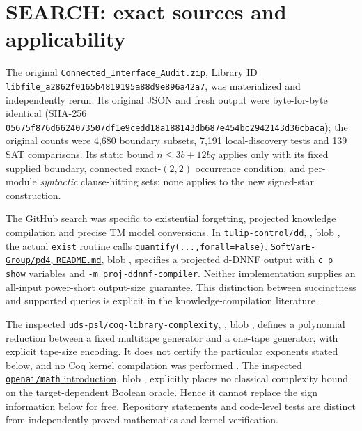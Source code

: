 \documentclass[11pt]{article}
\begin{document}
\section{SEARCH: exact sources and applicability}
The original \texttt{Connected\_Interface\_Audit.zip}, Library ID \texttt{libfile\_a2862f0165b4819195a88d9e896a42a7}, was materialized and independently rerun. Its original JSON and fresh output were byte-for-byte identical (SHA-256 \texttt{05675f876d6624073507df1e9cedd18a188143db687e454bc2942143d36cbaca}); the original counts were 4,680 boundary subsets, 7,191 local-discovery tests and 139 SAT comparisons. Its static bound $n\le3b+12bq$ applies only with its fixed supplied boundary, connected exact-$(2,2)$ occurrence condition, and per-module \emph{syntactic} clause-hitting sets; none applies to the new signed-star construction.

The GitHub search was specific to existential forgetting, projected knowledge compilation and precise TM model conversions. In \href{https://github.com/tulip-control/dd/blob/4442d498ddea1bec0071315f538cb5ef37443985/dd/bdd.py}{\texttt{tulip-control/dd}, }, blob \texttt{}, the actual \texttt{exist} routine calls \texttt{quantify(...,forall=False)}. \href{https://github.com/SoftVarE-Group/pd4/blob/main/README.md}{\texttt{SoftVarE-Group/pd4}, \texttt{README.md}}, blob \texttt{}, specifies a projected d-DNNF output with \texttt{c p show} variables and \texttt{-m proj-ddnnf-compiler}. Neither implementation supplies an all-input power-short output-size guarantee. This distinction between succinctness and supported queries is explicit in the knowledge-compilation literature \cite{darwiche2002}.

The inspected \href{https://github.com/uds-psl/coq-library-complexity/blob/coq-8.16/theories/NP/TM/mTM_to_singleTapeTM.v}{\texttt{uds-psl/coq-library-complexity}, }, blob \texttt{}, defines a polynomial reduction between a fixed multitape generator and a one-tape generator, with explicit tape-size encoding. It does not certify the particular exponents stated below, and no Coq kernel compilation was performed \cite{gaeher2021}. The inspected \href{https://github.com/openai/math/blob/main/preprints/Polynomial-Time-Unitary-Synthesis-from-a-Boolean-Oracle-October-5-2026/build/sections/01-introduction.tex}{\texttt{openai/math} introduction}, blob \texttt{}, explicitly places no classical complexity bound on the target-dependent Boolean oracle. Hence it cannot replace the sign information below for free. Repository statements and code-level tests are distinct from independently proved mathematics and kernel verification.
\end{document}
